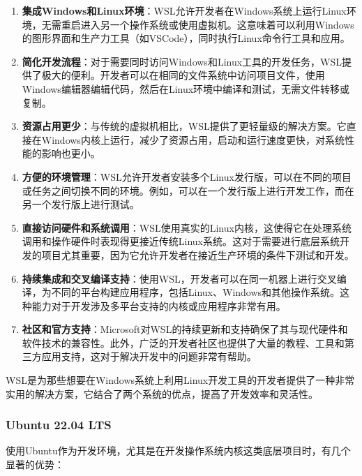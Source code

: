 \begin{enumerate}
    \item \textbf{集成Windows和Linux环境}：WSL允许开发者在Windows系统上运行Linux环境，无需重启进入另一个操作系统或使用虚拟机。这意味着可以利用Windows的图形界面和生产力工具（如VSCode），同时执行Linux命令行工具和应用。
    \item \textbf{简化开发流程}：对于需要同时访问Windows和Linux工具的开发任务，WSL提供了极大的便利。开发者可以在相同的文件系统中访问项目文件，使用Windows编辑器编辑代码，然后在Linux环境中编译和测试，无需文件转移或复制。
    \item \textbf{资源占用更少}：与传统的虚拟机相比，WSL提供了更轻量级的解决方案。它直接在Windows内核上运行，减少了资源占用，启动和运行速度更快，对系统性能的影响也更小。
    \item \textbf{方便的环境管理}：WSL允许开发者安装多个Linux发行版，可以在不同的项目或任务之间切换不同的环境。例如，可以在一个发行版上进行开发工作，而在另一个发行版上进行测试。
    \item \textbf{直接访问硬件和系统调用}：WSL使用真实的Linux内核，这使得它在处理系统调用和操作硬件时表现得更接近传统Linux系统。这对于需要进行底层系统开发的项目尤其重要，因为它允许开发者在接近生产环境的条件下测试和开发。
    \item \textbf{持续集成和交叉编译支持}：使用WSL，开发者可以在同一机器上进行交叉编译，为不同的平台构建应用程序，包括Linux、Windows和其他操作系统。这种能力对于开发涉及多平台支持的内核或应用程序非常有用。
    \item \textbf{社区和官方支持}：Microsoft对WSL的持续更新和支持确保了其与现代硬件和软件技术的兼容性。此外，广泛的开发者社区也提供了大量的教程、工具和第三方应用支持，这对于解决开发中的问题非常有帮助。
\end{enumerate}

WSL是为那些想要在Windows系统上利用Linux开发工具的开发者提供了一种非常实用的解决方案，它结合了两个系统的优点，提高了开发效率和灵活性。

\subsubsection{Ubuntu 22.04 LTS}

使用Ubuntu作为开发环境，尤其是在开发操作系统内核这类底层项目时，有几个显著的优势：

